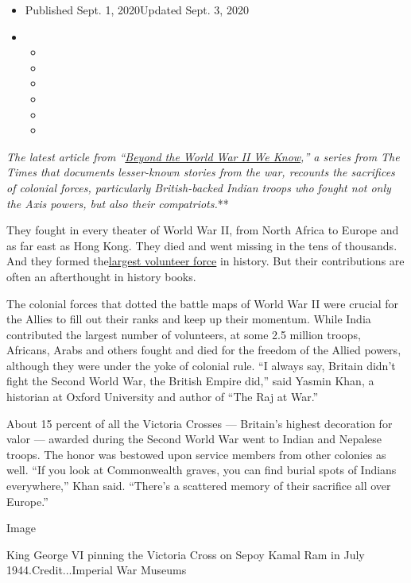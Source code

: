 \begin{itemize}
\item
  Published Sept. 1, 2020Updated Sept. 3, 2020
\item
  \begin{itemize}
  \item
  \item
  \item
  \item
  \item
  \item
  \end{itemize}
\end{itemize}

\emph{\emph{\emph{The latest article from
``}\href{https://www.nytimes3xbfgragh.onion/spotlight/beyond-wwii}{\emph{Beyond
the World War II We Know}}},'' a series from The Times that documents
lesser-known stories from the war, recounts the sacrifices of colonial
forces, particularly British-backed Indian troops who fought not only
the Axis powers, but also their compatriots.}**

They fought in every theater of World War II, from North Africa to
Europe and as far east as Hong Kong. They died and went missing in the
tens of thousands. And they formed
the\href{https://web.archive.org/web/20100618081321/http://www.cwgc.org/admin/files/cwgc_india.pdf}{largest
volunteer force} in history. But their contributions are often an
afterthought in history books.

The colonial forces that dotted the battle maps of World War II were
crucial for the Allies to fill out their ranks and keep up their
momentum. While India contributed the largest number of volunteers, at
some 2.5 million troops, Africans, Arabs and others fought and died for
the freedom of the Allied powers, although they were under the yoke of
colonial rule. ``I always say, Britain didn't fight the Second World
War, the British Empire did,'' said Yasmin Khan, a historian at Oxford
University and author of ``The Raj at War.''

About 15 percent of all the Victoria Crosses --- Britain's highest
decoration for valor --- awarded during the Second World War went to
Indian and Nepalese troops. The honor was bestowed upon service members
from other colonies as well. ``If you look at Commonwealth graves, you
can find burial spots of Indians everywhere,'' Khan said. ``There's a
scattered memory of their sacrifice all over Europe.''

Image

King George VI pinning the Victoria Cross on Sepoy Kamal Ram in July
1944.Credit...Imperial War Museums


